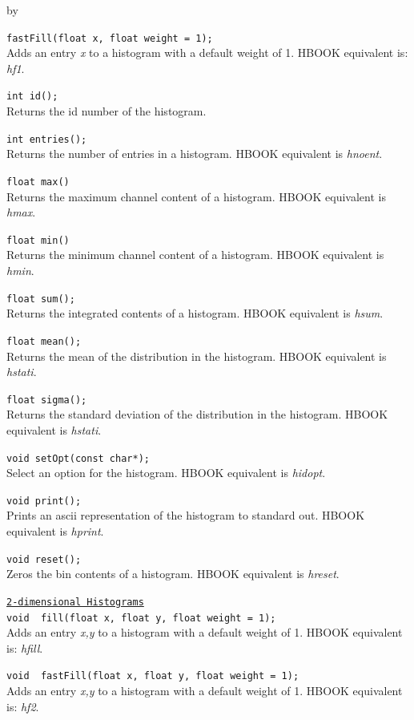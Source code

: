 \documentclass[twoside]{article}
\newcommand{\comp}[1]{\texttt{#1}}%
\newcommand{\entrylabel}[1]{\mbox{\textbf{{#1}}}\hfil}%
\newenvironment{entry}
{\begin{list}{}%
    {\renewcommand{\makelabel}{\entrylabel}%
     \setlength{\labelwidth}{90pt}%
     \setlength{\leftmargin}{\labelwidth}
     \advance\leftmargin by \labelsep%
      }%
    }%
  {\end{list}}
\newcommand{\Entrylabel}[1]%
{\raisebox{0pt}[1ex][0pt]{\makebox[\labelwidth][l]%
    {\parbox[t]{\labelwidth}{\hspace{0pt}\textbf{{#1}}}}}}
\newenvironment{Entry}%
{\renewcommand{\entrylabel}{\Entrylabel}\begin{entry}}%
  {\end{entry}}
\begin{document}
\begin{description}
\begin{Entry}
  \verb+fastFill(float x, float weight = 1);+\\
  Adds an entry {\em x} to a histogram with a default weight of 1.
  HBOOK equivalent is: {\em hf1}.

  \verb+int id();+\\
  Returns the id number of the histogram. 

  \verb+int entries();+\\
  Returns the number of entries in a histogram.  HBOOK equivalent
  is {\em  hnoent}.
  
  \verb+float max()+\\
  Returns the maximum channel content of a histogram.  HBOOK equivalent
  is {\em hmax}.

  \verb+float min()+\\
  Returns the minimum channel content of a histogram.  HBOOK equivalent
  is {\em hmin}.
  
  \verb+float sum();+\\
  Returns the integrated contents of a histogram.  HBOOK equivalent
  is {\em hsum}.

  \verb+float mean();+\\
  Returns the mean of the distribution in the histogram.
  HBOOK equivalent is {\em hstati}.
  
  \verb+float sigma();+\\
  Returns the standard deviation of the distribution in the histogram.
  HBOOK equivalent is {\em hstati}.
  
  \verb+void setOpt(const char*);+\\
  Select an option for the histogram.  HBOOK equivalent is {\em hidopt}.
  
  \verb+void print();+\\
  Prints an ascii representation of the histogram to standard out.
  HBOOK equivalent is {\em hprint}.
  
  \verb+void reset();+\\
  Zeros the bin contents of a histogram.  HBOOK equivalent is {\em hreset}.

  \comp{\underline{2-dimensional Histograms}}\\
  \verb+void  fill(float x, float y, float weight = 1);+\\
  Adds an entry {\em x,y} to a histogram with a default weight of 1.
  HBOOK equivalent is: {\em hfill}.

  \verb+void  fastFill(float x, float y, float weight = 1);+\\
  Adds an entry {\em x,y} to a histogram with a default weight of 1.
  HBOOK equivalent is: {\em hf2}.


\end{Entry}
\end{description}
\end{document}
